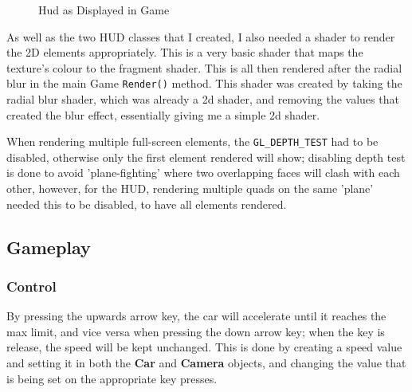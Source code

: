 \documentclass[10pt]{report}
\begin{document}
\begin{figure}[H]
    \centering
    \caption{Hud as Displayed in Game}
\end{figure}

As well as the two HUD classes that I created, I also needed a shader to render the 2D elements appropriately. This is a very basic shader that maps the texture's colour to the fragment shader. This is all then rendered after the radial blur in the main Game \colorbox{mygrey}{\lstinline{Render()}} method. This shader was created by taking the radial blur shader, which was already a 2d shader, and removing the values that created the blur effect, essentially giving me a simple 2d shader.

When rendering multiple full-screen elements, the \colorbox{mygrey}{\lstinline{GL_DEPTH_TEST}} had to be disabled, otherwise only the first element rendered will show; disabling depth test is done to avoid 'plane-fighting' where two overlapping faces will clash with each other, however, for the HUD, rendering multiple quads on the same 'plane' needed this to be disabled, to have all elements rendered.

\subsection*{Gameplay}
\subsubsection*{Control}
By pressing the upwards arrow key, the car will accelerate until it reaches the max limit, and vice versa when pressing the down arrow key; when the key is release, the speed will be kept unchanged. This is done by creating a speed value and setting it in both the \textbf{Car} and \textbf{Camera} objects, and changing the value that is being set on the appropriate key presses.
\end{document}
